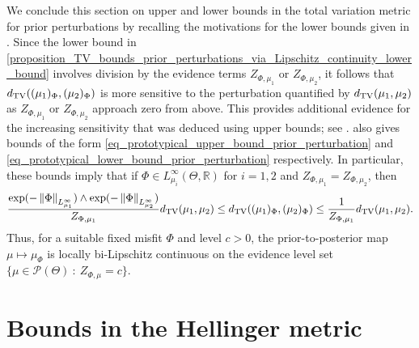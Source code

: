 \documentclass[a4paper]{scrartcl}
\theoremstyle{definition}
\numberwithin{equation}{section}
\newcommand{\R}{\mathbb{R}}
\newcommand{\Norm}[1]{\left\Vert #1 \right\Vert}
\newcommand{\TV}[0]{\textup{TV}}
\begin{document}
We conclude this section on upper and lower bounds in the total variation metric for prior perturbations by recalling the motivations for the lower bounds given in .  
Since the lower bound in \ref{proposition_TV_bounds_prior_perturbations_via_Lipschitz_continuity_lower_bound} involves division by the evidence terms $Z_{\Phi,\mu_1}$ or $Z_{\Phi,\mu_2}$, it follows that $d_{\TV}((\mu_1)_{\Phi},(\mu_2)_{\Phi})$ is more sensitive to the perturbation quantified by $d_{\TV}(\mu_1,\mu_2)$ as $Z_{\Phi,\mu_1}$ or $Z_{\Phi,\mu_2}$ approach zero from above. 
  This provides additional evidence for the increasing sensitivity that was deduced using upper bounds; see \cite[Remark 9]{Sprungk2020}.
  also gives bounds of the form \eqref{eq_prototypical_upper_bound_prior_perturbation} and \eqref{eq_prototypical_lower_bound_prior_perturbation} respectively.
  In particular, these bounds imply that if $\Phi\in L^\infty_{\mu_i}(\Theta,\R)$ for $i=1,2$ and $Z_{\Phi,\mu_1}=Z_{\Phi,\mu_2}$, then
 \begin{equation*}
  \frac{\exp(-\Norm{\Phi}_{L^\infty_{\mu_1}})\wedge \exp(-\Norm{\Phi}_{L^\infty_{\mu_2}})}{Z_{\Phi,\mu_1}}d_{\TV}(\mu_1,\mu_2) \leq d_{\TV}((\mu_1)_{\Phi},(\mu_2)_{\Phi})\leq \frac{1}{Z_{\Phi,\mu_1}}d_{\TV}(\mu_1,\mu_2).
 \end{equation*}
Thus, for a suitable fixed misfit $\Phi$ and level $c>0$, the prior-to-posterior map $\mu\mapsto \mu_\Phi$ is locally bi-Lipschitz continuous on the evidence level set $\{\mu\in\mathcal{P}(\Theta)\ :\ Z_{\Phi,\mu}=c\}$.

\section{Bounds in the Hellinger metric}
\label{sectionHellingerbounds}
\end{document}
